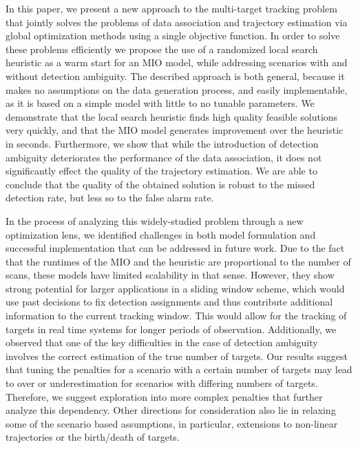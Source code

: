 In this paper, we present a new approach to the multi-target tracking problem that jointly solves the problems of data association and trajectory estimation via global optimization methods using a single objective function. In order to solve these problems efficiently we propose the use of a randomized local search heuristic as a warm start for an MIO model, while addressing scenarios with and without detection ambiguity. The described approach is both general, because it makes no assumptions on the data generation process, and easily implementable, as it is based on a simple model with little to no tunable parameters. We demonstrate that the local search heuristic finds high quality feasible solutions very quickly, and that the MIO model generates improvement over the heuristic in seconds. Furthermore, we show that while the introduction of detection ambiguity deteriorates the performance of the data association, it does not significantly effect the quality of the trajectory estimation. We are able to conclude that the quality of the  obtained solution is robust to the missed detection rate, but less so to the false alarm rate.

In the process of analyzing this widely-studied problem through a new optimization lens, we identified challenges in both model formulation and successful implementation that can be addressed in future work. Due to the fact that the runtimes of the MIO and the heuristic are proportional to the number of scans, these models have limited scalability in that sense. However, they show strong potential for larger applications in a sliding window scheme, which would use past decisions to fix detection assignments and thus contribute additional information to the current tracking window. This would allow for the tracking of targets in real time systems for longer periods of observation. Additionally, we observed that one of the key difficulties in the case of detection ambiguity involves the correct estimation of the true number of targets. Our results suggest that tuning the penalties for a scenario with a certain number of targets may lead to over or underestimation for scenarios with differing numbers of targets. Therefore, we suggest exploration into more complex penalties that further analyze this dependency. Other directions for consideration also lie in relaxing some of the scenario based assumptions, in particular, extensions to non-linear trajectories or the birth/death of targets. 